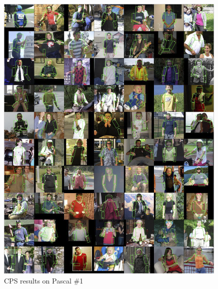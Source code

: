 


\begin{figure}[tb]
\begin{center}
\includegraphics[width=0.99\textwidth]{figs/pascal-cps-1.jpg}
\caption[CPS results on Pascal \#1]{CPS results on Pascal \#1}
\label{fig:pascal-cps1}
\end{center}
\end{figure}

